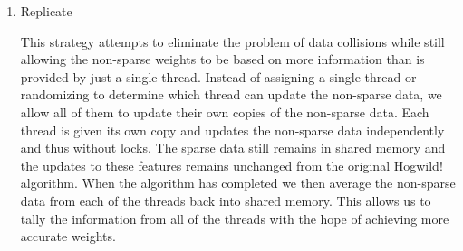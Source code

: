 \documentclass{article} %
\begin{document}
\begin{enumerate}
\item Replicate

This strategy attempts to eliminate the problem of data collisions while still allowing the non-sparse weights to be based on more information than is provided by just a single thread. Instead of assigning a single thread or randomizing to determine which thread can update the non-sparse data, we allow all of them to update their own copies of the non-sparse data.  Each thread is given its own copy and updates the non-sparse data independently and thus without locks.  The sparse data still remains in shared memory and the updates to these features remains unchanged from the original Hogwild! algorithm.  When the algorithm has completed we then average the non-sparse data from each of the threads back into shared memory.  This allows us to tally the information from all of the threads with the hope of achieving more accurate weights. 
\end{enumerate}
\end{document}

